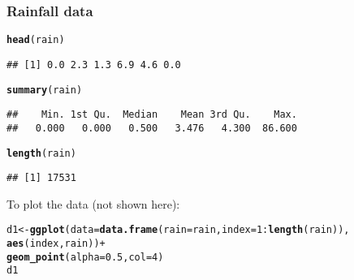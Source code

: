 \documentclass[10pt]{article}\usepackage[]{graphicx}\usepackage[]{color}
\makeatletter
\newcommand{\hlnum}[1]{\textcolor[rgb]{0.686,0.059,0.569}{#1}}%
\newcommand{\hlopt}[1]{\textcolor[rgb]{0,0,0}{#1}}%
\newcommand{\hlstd}[1]{\textcolor[rgb]{0.345,0.345,0.345}{#1}}%
\newcommand{\hlkwb}[1]{\textcolor[rgb]{0.69,0.353,0.396}{#1}}%
\newcommand{\hlkwc}[1]{\textcolor[rgb]{0.333,0.667,0.333}{#1}}%
\newcommand{\hlkwd}[1]{\textcolor[rgb]{0.737,0.353,0.396}{\textbf{#1}}}%
\newenvironment{kframe}{%
 \def\at@end@of@kframe{}%
 \ifinner\ifhmode%
  \def\at@end@of@kframe{\end{minipage}}%
  \begin{minipage}{\columnwidth}%
 \fi\fi%
 \def\FrameCommand##1{\hskip\@totalleftmargin \hskip-\fboxsep
 \colorbox{shadecolor}{##1}\hskip-\fboxsep
     \hskip-\linewidth \hskip-\@totalleftmargin \hskip\columnwidth}%
 \MakeFramed {\advance\hsize-\width
   \@totalleftmargin\z@ \linewidth\hsize
   \@setminipage}}%
 {\par\unskip\endMakeFramed%
 \at@end@of@kframe}
\newenvironment{knitrout}{}{} %
\makeatother
\begin{document}
\subsubsection{Rainfall data}
\begin{knitrout}
\color{fgcolor}\begin{kframe}
\begin{alltt}
\hlkwd{head}\hlstd{(rain)}
\end{alltt}
\begin{verbatim}
## [1] 0.0 2.3 1.3 6.9 4.6 0.0
\end{verbatim}
\begin{alltt}
\hlkwd{summary}\hlstd{(rain)}
\end{alltt}
\begin{verbatim}
##    Min. 1st Qu.  Median    Mean 3rd Qu.    Max. 
##   0.000   0.000   0.500   3.476   4.300  86.600
\end{verbatim}
\begin{alltt}
\hlkwd{length}\hlstd{(rain)}
\end{alltt}
\begin{verbatim}
## [1] 17531
\end{verbatim}
\end{kframe}
\end{knitrout}

To plot the data (not shown here):
\begin{knitrout}
\color{fgcolor}\begin{kframe}
\begin{alltt}
\hlstd{d1} \hlkwb{<-} \hlkwd{ggplot}\hlstd{(}\hlkwc{data}\hlstd{=}\hlkwd{data.frame}\hlstd{(}\hlkwc{rain}\hlstd{=rain,}\hlkwc{index}\hlstd{=}\hlnum{1}\hlopt{:}\hlkwd{length}\hlstd{(rain)),}
             \hlkwd{aes}\hlstd{(index,rain))} \hlopt{+}
    \hlkwd{geom_point}\hlstd{(}\hlkwc{alpha}\hlstd{=}\hlnum{0.5}\hlstd{,}\hlkwc{col}\hlstd{=}\hlnum{4}\hlstd{)}
\hlstd{d1}
\end{alltt}
\end{kframe}
\end{knitrout}
\end{document}

